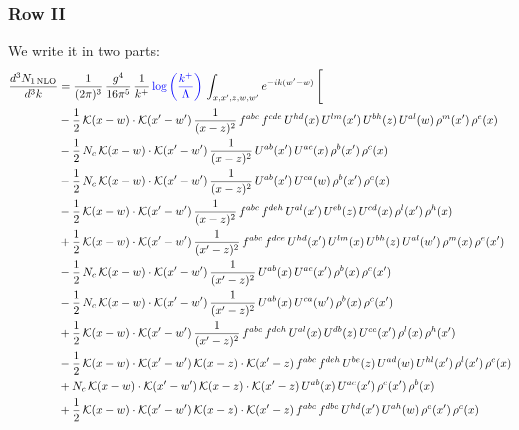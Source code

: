 \documentclass[9pt]{article}
\numberwithin{equation}{section}
\begin{document}
\subsubsection{Row II}
We write it in two parts:
\begin{align}
\frac{d^{3}N_{1\,\mathrm{NLO}}}{d^{3}k} & = \frac{1}{(2\pi)^{3}}\,\frac{g^{4}}{16\pi^{5}}\,\frac{1}{k^{+}}\,{\color{blue}\log{\left(\frac{k^{+}}{\Lambda}\right)}}\,\int_{x,x',z,w,w'}e^{-ik(w'-w)}\,\Bigg[\notag\\ & -\frac{1}{2}\,\mathcal{K}(x-w)\cdot\mathcal{K}(x'-w')\,\frac{1}{(x-z)^{2}}\,f^{abc}\,f^{cde}\,U^{hd}(x)\,U^{lm}(x')\,U^{bh}(z)\,U^{al}(w)\,\rho^{m}(x')\,\rho^{e}(x)\notag\\
& -\frac{1}{2}\,N_{c}\,\mathcal{K}(x-w)\cdot\mathcal{K}(x'-w')\,\frac{1}{(x-z)^{2}}\,U^{ab}(x')\,U^{ac}(x)\,\rho^{b}(x')\,\rho^{c}(x)\notag\\
& -\frac{1}{2}\,N_{c}\,\mathcal{K}(x-w)\cdot\mathcal{K}(x'-w')\,\frac{1}{(x-z)^{2}}\,U^{ab}(x')\,U^{ca}(w)\,\rho^{b}(x')\,\rho^{c}(x)\notag\\
& -\frac{1}{2}\,\mathcal{K}(x-w)\cdot\mathcal{K}(x'-w')\,\frac{1}{(x-z)^{2}}\,f^{abc}\,f^{deh}\,U^{al}(x')\,U^{eb}(z)\,U^{cd}(x)\,\rho^{l}(x')\,\rho^{h}(x)\notag\\
& +\frac{1}{2}\,\mathcal{K}(x-w)\cdot\mathcal{K}(x'-w')\,\frac{1}{(x'-z)^{2}}\,f^{abc}\,f^{dce}\,U^{hd}(x')\,U^{lm}(x)\,U^{bh}(z)\,U^{al}(w')\,\rho^{m}(x)\,\rho^{e}(x')\notag\\
& -\frac{1}{2}\,N_{c}\,\mathcal{K}(x-w)\cdot\mathcal{K}(x'-w')\,\frac{1}{(x'-z)^{2}}\,U^{ab}(x)\,U^{ac}(x')\,\rho^{b}(x)\,\rho^{c}(x')\notag\\
& -\frac{1}{2}\,N_{c}\,\mathcal{K}(x-w)\cdot\mathcal{K}(x'-w')\,\frac{1}{(x'-z)^{2}}\,U^{ab}(x)\,U^{ca}(w')\,\rho^{b}(x)\,\rho^{c}(x')\notag\\
& +\frac{1}{2}\,\mathcal{K}(x-w)\cdot\mathcal{K}(x'-w')\,\frac{1}{(x'-z)^{2}}\,f^{abc}\,f^{deh}\,U^{al}(x)\,U^{db}(z)\,U^{ce}(x')\,\rho^{l}(x)\,\rho^{h}(x')\notag\\
& -\frac{1}{2}\,\mathcal{K}(x-w)\cdot\mathcal{K}(x'-w')\,\mathcal{K}(x-z)\cdot\mathcal{K}(x'-z)\,f^{abc}\,f^{deh}\,U^{be}(z)\,U^{ad}(w)\,U^{hl}(x')\,\rho^{l}(x')\,\rho^{c}(x)\notag\\
& +N_{c}\,\mathcal{K}(x-w)\cdot\mathcal{K}(x'-w')\,\mathcal{K}(x-z)\cdot\mathcal{K}(x'-z)\,U^{ab}(x)\,U^{ac}(x')\,\rho^{c}(x')\,\rho^{b}(x)\notag\\
& +\frac{1}{2}\,\mathcal{K}(x-w)\cdot\mathcal{K}(x'-w')\,\mathcal{K}(x-z)\cdot\mathcal{K}(x'-z)\,f^{abc}\,f^{dbe}\,U^{hd}(x')\,U^{ah}(w)\,\rho^{e}(x')\,\rho^{c}(x)\notag\\

\end{align}
\end{document}

